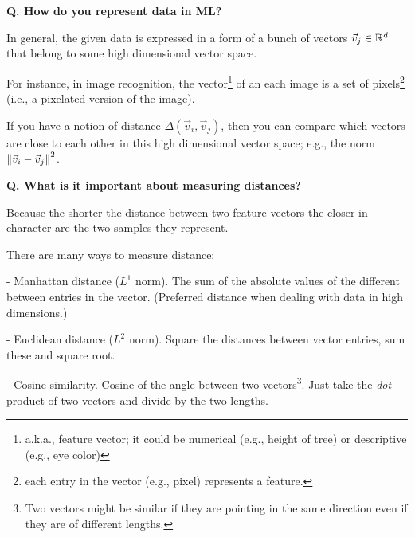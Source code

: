 \begin{frame}[fragile]{\textbf{Q. How do you represent data in ML?}}
  \begin{wideitemize}
    \item In general, the given data is expressed in a form of a bunch of vectors
    $\vec{v}_{j} \in {\Bbb R}^{d}$ that belong to some high dimensional vector space.
    \item For instance, in image recognition, the vector\footnote{a.k.a., feature
    vector; it could be numerical (e.g., height of tree) or descriptive
    (e.g., eye color)} of an each image is a set of pixels\footnote{each entry
    in the vector (e.g., pixel) represents a feature.} (i.e., a pixelated
    version of the image).
    \item If you have a notion of distance $\Delta(\vec{v}_{i}, \vec{v}_{j})$,
    then you can compare which vectors are close to each other in this high
    dimensional vector space; e.g., the norm $\left\lVert \vec{v}_{i} - \vec{v}_{j} \right\rVert^2$.
  \end{wideitemize}
\end{frame}

\begin{frame}[fragile, label={distance}]{\textbf{Q. What is it important about measuring distances?}}
  \begin{wideitemize}
    \item Because the shorter the distance between two feature vectors the closer
    in character are the two samples they represent.
    \item There are many ways to measure distance:
    \begin{wideitemize}
      \item[-] Manhattan distance ($L^{1}$ norm). The sum of the absolute values of the different between
      entries in the vector. (Preferred distance when dealing with data in high dimensions.)
      \item[-] Euclidean distance ($L^{2}$ norm). Square the distances between vector entries,
      sum these and square root.
      \item[-] Cosine similarity. Cosine of the angle between two vectors\footnote{Two vectors
      might be similar if they are pointing in the same direction even if they are of different lengths.}.
      Just take the \textit{dot} product of two vectors and divide by the two lengths.
    \end{wideitemize}
  \end{wideitemize}
\end{frame}

